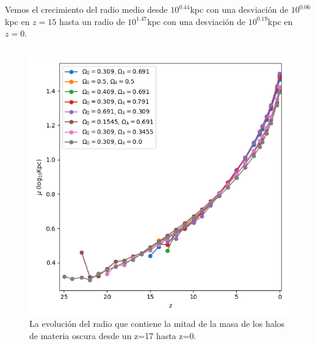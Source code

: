 \documentclass{beamer}
\begin{document}
	\begin{frame}
		\small Vemos el crecimiento del radio medio desde $10^{0.44}$kpc con una desviación de $10^{0.06}$kpc en $z=15$ hasta un radio de $10^{1.47}$kpc con una desviación de $10^{0.19}$kpc en $z=0$.
		
		\begin{columns}[t]
			\begin{column}{.5\textwidth}
				\begin{figure}
					\centering
					\includegraphics[scale=0.3]{Conc/HalfMassRad_Mean_Conc.png}
					\caption{\footnotesize La evolución del radio que contiene la mitad de la masa de los halos de materia oscura desde un z=17 hasta z=0.}
					\label{fig:Conc-HalfMassRadMean}
				\end{figure}
			\end{column}


\end{columns}
\end{frame}
\end{document}
